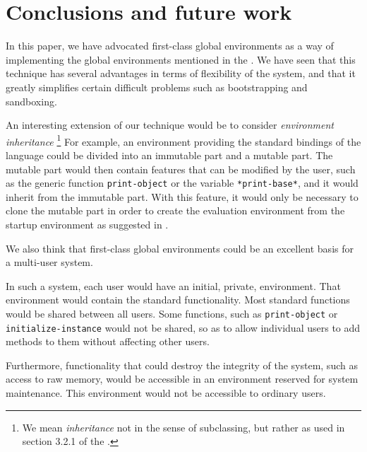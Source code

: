 \section{Conclusions and future work}

In this paper, we have advocated first-class global environments as a
way of implementing the global environments mentioned in the \hs{}.
We have seen that this technique has several advantages in terms of
flexibility of the system, and that it greatly simplifies certain
difficult problems such as bootstrapping and sandboxing.

An interesting extension of our technique would be to consider
\emph{environment inheritance}%
\footnote{We mean \emph{inheritance} not in the sense of subclassing,
  but rather as used in section 3.2.1 of the \hs{}.}
For example, an environment providing the standard bindings of the
\commonlisp{} language could be divided into an immutable part and a
mutable part.  The mutable part would then contain features that can
be modified by the user, such as the generic function
\texttt{print-object} or the variable \texttt{*print-base*}, and it
would inherit from the immutable part.  With this feature, it would
only be necessary to clone the mutable part in order to create the
evaluation environment from the startup environment as suggested in
.

We also think that first-class global environments could be an
excellent basis for a multi-user \commonlisp{} system.

In such a system, each user would have an initial, private,
environment.  That environment would contain the standard
\commonlisp{} functionality.  Most standard \commonlisp{} functions
would be shared between all users.  Some functions, such as
\texttt{print-object} or \texttt{initialize-instance} would not be
shared, so as to allow individual users to add methods to them without
affecting other users.

Furthermore, functionality that could destroy the integrity of the
system, such as access to raw memory, would be accessible in an
environment reserved for system maintenance.  This environment would
not be accessible to ordinary users.
